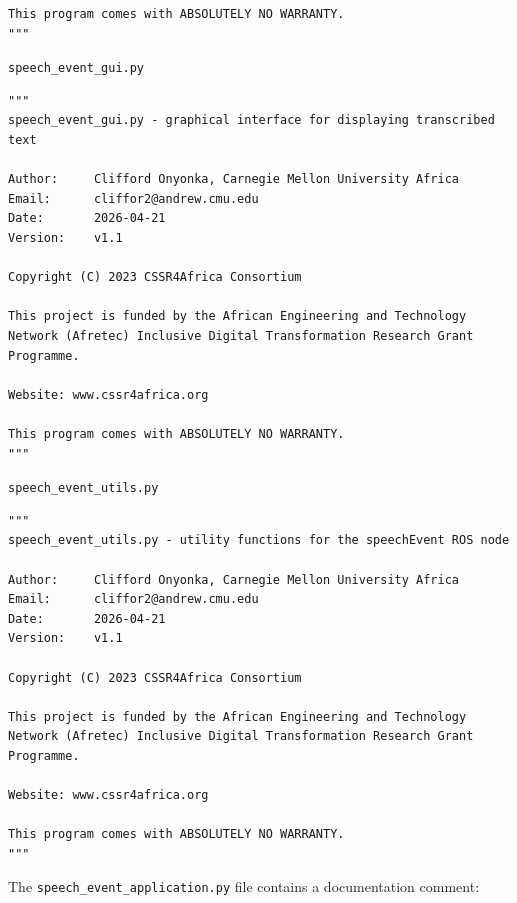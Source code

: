 \documentclass{CSSRforAfrica}
\newcommand{\blank}{~\\}
\newcommand{\checkboxChecked}{\fbox{\ding{51}}} %
\begin{document}
\begin{description}
{\begin{verbatim}
This program comes with ABSOLUTELY NO WARRANTY.
"""
\end{verbatim} }

\item[\checkboxChecked]  {\small \verb+speech_event_gui.py+} 
{\small \begin{verbatim}
"""
speech_event_gui.py - graphical interface for displaying transcribed text

Author:     Clifford Onyonka, Carnegie Mellon University Africa
Email:      cliffor2@andrew.cmu.edu
Date:       2026-04-21
Version:    v1.1

Copyright (C) 2023 CSSR4Africa Consortium

This project is funded by the African Engineering and Technology
Network (Afretec) Inclusive Digital Transformation Research Grant
Programme.

Website: www.cssr4africa.org

This program comes with ABSOLUTELY NO WARRANTY.
"""
\end{verbatim} }

\item[\checkboxChecked]  {\small \verb+speech_event_utils.py+} 
{\small \begin{verbatim}
"""
speech_event_utils.py - utility functions for the speechEvent ROS node

Author:     Clifford Onyonka, Carnegie Mellon University Africa
Email:      cliffor2@andrew.cmu.edu
Date:       2026-04-21
Version:    v1.1

Copyright (C) 2023 CSSR4Africa Consortium

This project is funded by the African Engineering and Technology
Network (Afretec) Inclusive Digital Transformation Research Grant
Programme.

Website: www.cssr4africa.org

This program comes with ABSOLUTELY NO WARRANTY.
"""
\end{verbatim} }

\end{description} 


\noindent The {\small \verb+speech_event_application.py+} file contains a documentation comment:
\end{document}
